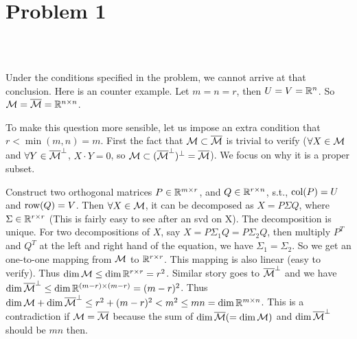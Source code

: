 \section{Problem 1}~\label{sec:prob1}

\subsection{} %

Under the conditions specified in the problem,
we cannot arrive at that conclusion.
Here is an counter example.
Let $m=n=r$, then $U=V={\mathbb{R}}^n$.
So ${\mathcal{M}}={\overline{{\mathcal{M}}}}={\mathbb{R}}^{n\times n}$.

To make this question more sensible,
let us impose an extra condition that
$r<\min(m,n)=m$.
First the fact that ${\mathcal{M}} \subset {\overline{{\mathcal{M}}}}$ is trivial to verify
($\forall X \in {\mathcal{M}}$ and $\forall Y \in {\overline{{\mathcal{M}}}}^\perp$, $X\cdot Y=0$,
so ${\mathcal{M}} \subset ({\overline{{\mathcal{M}}}}^\perp)^\perp={\overline{{\mathcal{M}}}}$).
We focus on why it is a proper subset.

Construct two orthogonal matrices $P\in{\mathbb{R}}^{m\times r}$,
and $Q\in {\mathbb{R}}^{r\times n}$, s.t.,
${\text{col}}(P)=U$ and ${\text{row}}(Q)=V$.
Then $\forall X\in{\mathcal{M}}$, it can be decomposed as
$X=P\Sigma Q$, where $\Sigma\in{\mathbb{R}}^{r\times r}$
(This is fairly easy to see after an svd on X).
The decomposition is unique.
For two decompositions of $X$,
say $X=P\Sigma_1 Q=P\Sigma_2 Q$,
then multiply $P^T$ and $Q^T$ at the left and right hand of the equation,
we have $\Sigma_1=\Sigma_2$.
So we get an one-to-one mapping from ${\mathcal{M}}$ to ${\mathbb{R}}^{r\times r}$.
This mapping is also linear (easy to verify).
Thus $\dim {\mathcal{M}} \le \dim {\mathbb{R}}^{r\times r} = r^2$.
Similar story goes to ${\overline{{\mathcal{M}}}}^\perp$ and we have
$\dim {\overline{{\mathcal{M}}}}^\perp \le \dim {\mathbb{R}}^{(m-r)\times(m-r)} = (m-r)^2$.
Thus $\dim {\mathcal{M}} + \dim {\overline{{\mathcal{M}}}}^\perp \le r^2 + (m-r)^2 < m^2 \le mn = \dim {\mathbb{R}}^{m\times n}$.
This is a contradiction if ${\mathcal{M}}={\overline{{\mathcal{M}}}}$ because
the sum of $\dim {\overline{{\mathcal{M}}}}(=\dim {\mathcal{M}})$ and $\dim {\overline{{\mathcal{M}}}}^\perp$ should be $mn$ then.

\subsection{} %
